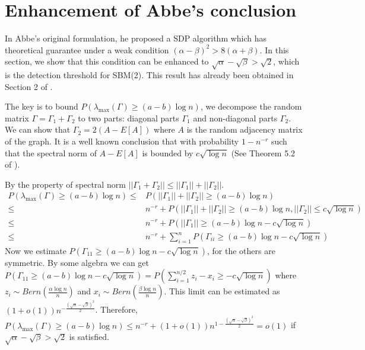 \documentclass{ctexart}
\begin{document}
\section{Enhancement of Abbe's conclusion}\label{sec:original}
In Abbe's original formulation, he proposed a SDP algorithm which has theoretical
guarantee under a weak condition $(\alpha - \beta)^2 > 8(\alpha + \beta)$.
In this section, we show that this condition can be enhanced to $\sqrt{\alpha} - \sqrt{\beta} > \sqrt{2}$, which
is the detection threshold for SBM(2).
This result has already been obtained in Section 2 of \cite{hajek2016achieving}.

The key is to bound
$P(\lambda_{\max}(\Gamma) \geq (a-b)\log n)$,
we decompose the random matrix $\Gamma=\Gamma_1 +\Gamma_2$ to two parts: diagonal parts $\Gamma_1$ and non-diagonal parts $\Gamma_2$.
We can show that $\Gamma_2 = 2(A-E[A])$ where $A$ is the random adjacency matrix of the graph. It is a well known conclusion that
with probability $1-n^{-r}$ such that the spectral norm of $A-E[A]$ is bounded by $c\sqrt{\log n}$ (See Theorem 5.2 of \cite{lei2015consistency}).

By the property of spectral norm $||\Gamma_1 + \Gamma_2|| \leq ||\Gamma_1 || + ||\Gamma_2||$.
\begin{align*}
P(\lambda_{\max}(\Gamma) \geq (a-b)\log n) \leq & P(||\Gamma_1 || + ||\Gamma_2|| \geq (a-b) \log n)  \\
\leq & n^{-r} +
P(||\Gamma_1 || + ||\Gamma_2|| \geq (a-b) \log n, ||\Gamma_2||
\leq c\sqrt{\log n})\\
\leq & n^{-r} + P(||\Gamma_1|| \geq (a-b)\log n -c\sqrt{\log n}) \\
\leq & n^{-r} + \sum_{i=1}^n P(\Gamma_{ii} \geq (a-b)\log n -c\sqrt{\log n})
\end{align*}
Now we estimate $P(\Gamma_{11} \geq (a-b)\log n -c\sqrt{\log n})$, for the others are symmetric.
By some algebra we can get
$P(\Gamma_{11} \geq (a-b)\log n -c\sqrt{\log n}) = P(\sum_{i=1}^{n/2} z_i - x_i \geq -c\sqrt{\log n})$
where $z_i \sim Bern(\frac{\alpha \log n}{n})$ and $x_i \sim Bern(\frac{\beta \log n}{n})$.
This limit can be estimated as $(1+o(1))n^{-\frac{(\sqrt{\alpha}-\sqrt{\beta})^2}{2}}$.
Therefore, $P(\lambda_{\max}(\Gamma) \geq (a-b)\log n)\leq n^{-r} + (1+o(1))n^{1-\frac{(\sqrt{\alpha}-\sqrt{\beta})^2}{2}} = o(1)$
if $\sqrt{\alpha} - \sqrt{\beta} > \sqrt{2}$ is satisfied.


	
\end{document}
